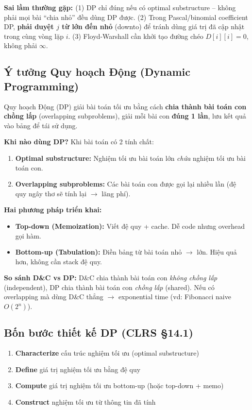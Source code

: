\documentclass[10pt]{article}
\newcommand{\pitfall}[1]{%
  \begin{tcolorbox}[colback=red!5!white, colframe=red!60!white, leftrule=3pt,
    toprule=0pt, bottomrule=0pt, rightrule=0pt,
    boxsep=2pt, left=6pt, right=6pt, top=4pt, bottom=4pt]
  \small\textbf{\textcolor{red!70!black}{Sai lầm thường gặp: }}#1
  \end{tcolorbox}}
\providecommand{\tightlist}{\setlength{\itemsep}{0pt}\setlength{\parskip}{0pt}}
\begin{document}
\pitfall{(1) DP chỉ đúng nếu có optimal substructure -- không phải mọi bài ``chia nhỏ'' đều dùng DP được. (2) Trong Pascal/binomial coefficient DP, \textbf{phải duyệt $j$ từ lớn đến nhỏ} (downto) để tránh dùng giá trị đã cập nhật trong cùng vòng lặp $i$. (3) Floyd-Warshall cần khởi tạo đường chéo $D[i][i] = 0$, không phải $\infty$.}


\subsection{Ý tưởng Quy hoạch Động (Dynamic Programming)}\label{y-tuong-dp}

Quy hoạch Động (DP) giải bài toán tối ưu bằng cách \textbf{chia thành bài toán con chồng lấp} (overlapping subproblems), giải mỗi bài con \textbf{đúng 1 lần}, lưu kết quả vào bảng để tái sử dụng.

\textbf{Khi nào dùng DP?} Khi bài toán có 2 tính chất:
\begin{enumerate}
\item \textbf{Optimal substructure:} Nghiệm tối ưu bài toán lớn \textit{chứa} nghiệm tối ưu bài toán con.
\item \textbf{Overlapping subproblems:} Các bài toán con được gọi lại nhiều lần (đệ quy ngây thơ sẽ tính lại $\to$ lãng phí).
\end{enumerate}

\textbf{Hai phương pháp triển khai:}
\begin{itemize}
\item \textbf{Top-down (Memoization):} Viết đệ quy + cache. Dễ code nhưng overhead gọi hàm.
\item \textbf{Bottom-up (Tabulation):} Điền bảng từ bài toán nhỏ $\to$ lớn. Hiệu quả hơn, không cần stack đệ quy.
\end{itemize}

\textbf{So sánh D\&C vs DP:} D\&C chia thành bài toán con \textit{không chồng lấp} (independent), DP chia thành bài toán con \textit{chồng lấp} (shared). Nếu có overlapping mà dùng D\&C thẳng $\to$ exponential time (vd: Fibonacci naive $O(2^n)$).

\subsection{\texorpdfstring{Bốn bước thiết kế DP (CLRS
\S 14.1)}{Bốn bước thiết kế DP (CLRS 14.1)}}\label{bux1ed1n-bux1b0ux1edbc-thiux1ebft-kux1ebf-dp-clrs-14.1}

\begin{enumerate}
\def\labelenumi{\arabic{enumi}.}
\tightlist
\item
  \textbf{Characterize} cấu trúc nghiệm tối ưu (optimal substructure)
\item
  \textbf{Define} giá trị nghiệm tối ưu bằng đệ quy
\item
  \textbf{Compute} giá trị nghiệm tối ưu bottom-up (hoặc top-down +
  memo)
\item
  \textbf{Construct} nghiệm tối ưu từ thông tin đã tính
\end{enumerate}
\end{document}
